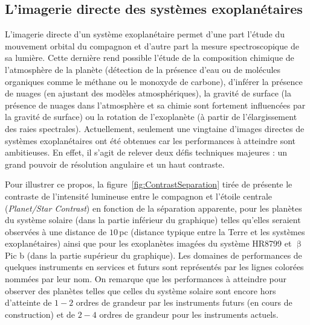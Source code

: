 \subsection{L'imagerie directe des systèmes exoplanétaires}
\label{sec:ImagerieDirecte}

L'imagerie directe d'un système exoplanétaire permet d'une part l'étude du mouvement orbital du compagnon \citep{chauvin2012, wang2018} et d'autre part la mesure spectroscopique de sa lumière. Cette dernière rend possible l'étude de la composition chimique de l'atmosphère de la planète (détection de la présence d'eau ou de molécules organiques comme le méthane ou le monoxyde de carbone), d'inférer la présence de nuages \citep{marley2015} (en ajustant des modèles atmosphériques), la gravité de surface \citep{marley2012} (la présence de nuages dans l'atmosphère et sa chimie sont fortement influencées par la gravité de surface) ou la rotation de l'exoplanète \citep{bryan2020} (à partir de l'élargissement des raies spectrales). Actuellement, seulement une vingtaine d'images directes de systèmes exoplanétaires ont été obtenues \citep{currie2022a} car les performances à atteindre sont ambitieuses. En effet, il s'agit de relever deux défis techniques majeures : un grand pouvoir de résolution angulaire et un haut contraste.

Pour illustrer ce propos, la figure~\ref{fig:ContrastSeparation} tirée de \cite{mawet2012} présente le contraste de l'intensité lumineuse entre le compagnon et l'étoile centrale (\textit{Planet/Star Contrast}) en fonction de la séparation apparente, pour les planètes du système solaire (dans la partie inférieur du graphique) telles qu'elles seraient observées à une distance de $10 \,$pc (distance typique entre la Terre et les systèmes exoplanétaires) ainsi que pour les exoplanètes imagées du système HR8799 \citep{marois2008} et $\upbeta$ Pic b \citep{lagrange2010} (dans la partie supérieur du graphique). Les domaines de performances de quelques instruments en services et futurs sont représentés par les lignes colorées nommées par leur nom. On remarque que les performances à atteindre pour observer des planètes telles que celles du système solaire sont encore hors d'atteinte de $1-2$ ordres de grandeur par les instruments futurs (en cours de construction) et de $2-4$ ordres de grandeur pour les instruments actuels.


